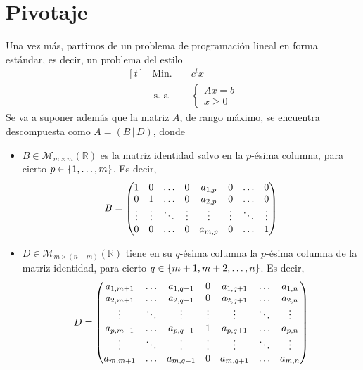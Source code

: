 \documentclass[11pt]{report}
\theoremstyle{mytheorem}
\theoremstyle{mydefinition}
\theoremstyle{myexample}
\newcommand{\R}{\mathbb R}
\begin{document}
\section{Pivotaje}
Una vez más, partimos de un problema de programación lineal en forma estándar, es decir, un problema del estilo
\[\begin{aligned}[t]
&\text{Min. } && c^tx \\
& \, \text{s. a} &&\begin{cases}
    Ax = b \\
    x \geq 0
\end{cases}
\end{aligned}\]
Se va a suponer además que la matriz $A$, de rango máximo, se encuentra descompuesta como $A = ( B \, | \, D)$, donde
\begin{itemize}
    \item $B \in \mathcal{M}_{m \times m}(\R)$ es la matriz identidad salvo en la $p$-ésima columna, para cierto $p \in \{1,\mathellipsis,m\}$. Es decir,
    \[B = \begin{pmatrix}
    1 & 0 & \mathellipsis & 0 & a_{1,p} & 0 & \mathellipsis & 0 \\
    0 & 1 & \mathellipsis & 0 & a_{2,p} & 0 & \mathellipsis & 0 \\
    \vdots & \vdots & \ddots & \vdots & \vdots & \vdots & \ddots & \vdots \\
    0 & 0 & \mathellipsis & 0 & a_{m,p} & 0 & \mathellipsis & 1
    \end{pmatrix}\]
    \item $D \in \mathcal{M}_{m \times (n-m)}(\R)$ tiene en su $q$-ésima columna la $p$-ésima columna de la matriz identidad, para cierto $q \in \{m+1,m+2,\mathellipsis,n\}$. Es decir,
    \[D = \begin{pmatrix}
    a_{1,m+1} & \mathellipsis & a_{1,q-1} & 0 & a_{1,q+1} & \mathellipsis & a_{1,n} \\
    a_{2,m+1} & \mathellipsis & a_{2,q-1} & 0 & a_{2,q+1} & \mathellipsis & a_{2,n} \\
    \vdots & \ddots & \vdots & \vdots & \vdots & \ddots & \vdots \\
    a_{p,m+1} & \mathellipsis & a_{p,q-1} & 1 & a_{p,q+1} & \mathellipsis & a_{p,n} \\
    \vdots & \ddots & \vdots & \vdots & \vdots & \ddots & \vdots \\
    a_{m,m+1} & \mathellipsis & a_{m,q-1} & 0 & a_{m,q+1} & \mathellipsis & a_{m,n}
    \end{pmatrix}\]
\end{itemize}
\end{document}
